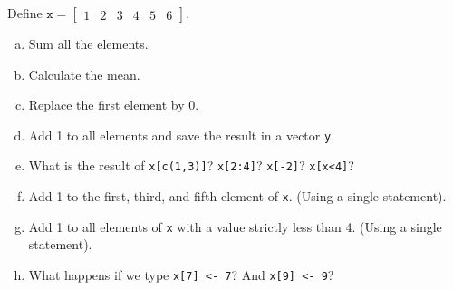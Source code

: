 \documentclass{beamer}
\begin{document}
\begin{frame}[allowframebreaks]
	\begin{myexc}
	\fontsize{9pt}{12}\selectfont
	Define $\texttt{x} = \begin{bmatrix}
		1 & 2 & 3 & 4 & 5 & 6
	\end{bmatrix}$.
	\begin{enumerate}[(a)]
		\item
		Sum all the elements.
		\item
		Calculate the mean.
		\item
		Replace the first element by 0.
		\item
		Add 1 to all elements and save the result in a vector \texttt{y}.
		\item
		What is the result of \texttt{x[c(1,3)]}? \texttt{x[2:4]}? \texttt{x[-2]}? \texttt{x[x<4]}?
		\item
		Add 1 to the first, third, and fifth element of \texttt{x}. (Using a single statement).
		\item
		Add 1 to all elements of \texttt{x} with a value strictly less than 4. (Using a single statement).
		\item
		What happens if we type \texttt{x[7] <- 7}? And \texttt{x[9] <- 9}?
	\end{enumerate}
	\addtocounter{exccounter}{1}
	\end{myexc}
	
	\vskip2cm
	

\end{frame}
\end{document}
